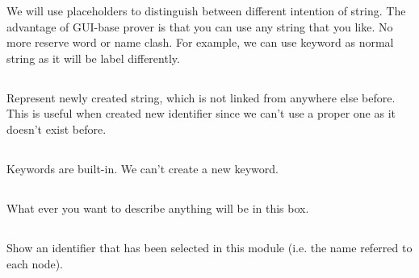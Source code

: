 \documentclass[11pt, a4paper]{article}
\begin{document}
We will use placeholders to distinguish between different intention of string. The advantage of GUI-base prover is that you can use any string that you like. No more reserve word or name clash. For example, we can use keyword as normal string as it will be label differently.


\newcommand{\pstr}[1]{
    \tcbox[on line, frame empty, colback = pstrColor!30!defaultColor, size = small]{
        \texttt{\textbf{\textcolor{pstrColor}{#1}}}
    }
}
\subsection{\pstr{string}} Represent newly created string, which is not linked from anywhere else before. This is useful when created new identifier since we can't use a proper one as it doesn't exist before.

\newcommand{\pkw}[1]{
    \texttt{\textbf{\color{pkwColor}{#1}}}
}
\subsection{\pkw{keyword}} Keywords are built-in. We can't create a new keyword.

\newcommand{\pcomment}[1]{
    \tcbox[on line, frame empty, colback = pcommentColor!30!defaultColor, size = small] {
        \textcolor{pcommentColor}{#1}
    }
}
\subsection{\pcomment{comment}} What ever you want to describe anything will be in this box.

\newcommand{\pid}[1]{
    \tcbox[on line, frame empty, colback = pidColor!30!defaultColor, size = small]{
        \texttt{\textbf{\textcolor{pidColor}{#1}}}
    }
}
\subsection{\pid{identifier}} Show an identifier that has been selected in this module (i.e. the name referred to each node).

\newcommand{\pgmr}[1]{
    \tcbox[on line, frame empty, colback = pgmrColor!30!defaultColor, size = small, grow to left by=0cm, grow to right by=0cm]{
        \texttt{\textbf{\textcolor{pgmrColor}{#1}}}
    }
}
\end{document}
